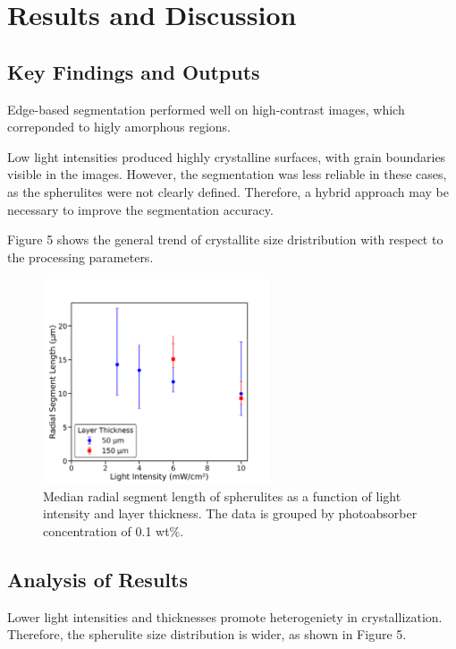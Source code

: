 \documentclass[12pt]{article}
\begin{document}
\section{Results and Discussion}

\subsection{Key Findings and Outputs}
Edge-based segmentation performed well on high-contrast images, which correponded to higly amorphous regions.

Low light intensities produced highly crystalline surfaces, with grain boundaries visible in the images. However,
the segmentation was less reliable in these cases, as the spherulites were not clearly defined. Therefore, a hybrid 
approach may be necessary to improve the segmentation accuracy.

Figure 5 shows the general trend of crystallite size dristribution with respect to the processing parameters.

\begin{figure}[H]
    \centering
    \includegraphics[width=0.6\textwidth]{figures/median_diameter_vs_light_0.1wt.png}
    \caption{\centering Median radial segment length of spherulites as a function of light intensity and layer thickness.
    The data is grouped by photoabsorber concentration of 0.1 wt\%.}
\end{figure}


\subsection{Analysis of Results}
Lower light intensities and thicknesses promote heterogeniety in crystallization. Therefore, the spherulite 
size distribution is wider, as shown in Figure 5. 
\end{document}
